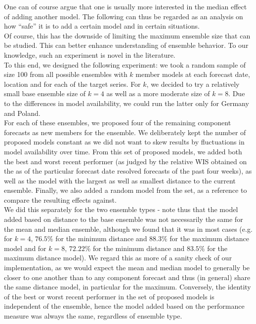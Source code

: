 One can of course argue that one is usually more interested in the median effect of adding another model. The following can thus be regarded as an analysis on how ``safe'' it is to add a certain model and in certain situations.\\ 
Of course, this has the downside of limiting the maximum ensemble size that can be studied. This can better enhance understanding of ensemble behavior. To our knowledge, such an experiment is novel in the literature. \\
To this end, we designed the following experiment: we took a random sample of size 100 from all possible ensembles with $k$ member models at each forecast date, location and for each of the target series. For $k$, we decided to try a relatively small base ensemble size of $k = 4$ as well as a more moderate size of $k = 8$. Due to the differences in model availability, we could run the latter only for Germany and Poland.\\
For each of these ensembles, we proposed four of the remaining component forecasts as new members for the ensemble. We deliberately kept the number of proposed models constant as we did not want to skew results by fluctuations in model availability over time. From this set of proposed models, we added both the best and worst recent performer (as judged by the relative WIS obtained on the as of the particular forecast date resolved forecasts of the past four weeks), as well as the model with the largest as well as smallest distance to the current ensemble. Finally, we also added a random model from the set, as a reference to compare the resulting effects against. \\
We did this separately for the two ensemble types - note thus that the model added based on distance to the base ensemble was not necessarily the same for the mean and median ensemble, although we found that it was in most cases (e.g. for $k = 4$, $76.5\%$ for the minimum distance and $88.3\%$ for the maximum distance model and for $k = 8$, $72.22\%$ for the minimum distance and $83.5\%$ for the maximum distance model). We regard this as more of a sanity check of our implementation, as we would expect the mean and median model to generally be closer to one another than to any component forecast and thus (in general) share the same distance model, in particular for the maximum. Conversely, the identity of the best or worst recent performer in the set of proposed models is independent of the ensemble, hence the model added based on the performance measure was always the same, regardless of ensemble type.\\
